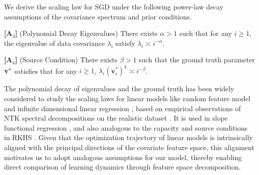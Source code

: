 We derive the scaling law for SGD under the following power-law decay assumptions of the covariance spectrum and prior conditions.
\begin{assumption}\label{ass-ss}
    \item[\textbf{[A$_\text{3}$]}] (Polynomial Decay Eigenvalues) There exists $\alpha>1$ such that for any $i\ge 1$, the eigenvalue of data covariance $\lambda_i$ satisfy $\lambda_i\asymp i^{-\alpha}$.
    \item[\textbf{[A$_\text{4}$]}] (Source Condition) There exists $\beta>1$ such that the ground truth parameter $\mathbf{v}^*$ satisfies that for any $i\ge 1$, 
 $\lambda _i\left ( \mathbf{v}_i^{*}  \right ) ^4 \asymp i^{-\beta}$.
\end{assumption}


\begin{remark}
     The polynomial decay of eigenvalues and the ground truth has been widely considered to study the scaling laws for linear models like random feature model \citep{bahri2024explaining, bordelon2024a} and infinite dimensional linear regression \citep{lin2024scaling}, based on empirical observations of NTK spectral decompositions on the realistic dataset \citep{bahri2024explaining,bordelon2021learning}. It is used in slope functional regression \citep{10.1214/009053606000000830}, and also analogous to the capacity and source conditions in RKHS \citep{wainwright2019high,bietti2019inductive}. Given that the optimization trajectory of linear models is intrinsically aligned with the principal directions of the covariate feature space, this alignment motivates us to adopt analogous assumptions for our model, thereby enabling direct comparison of learning dynamics through feature space decomposition.
\end{remark}



